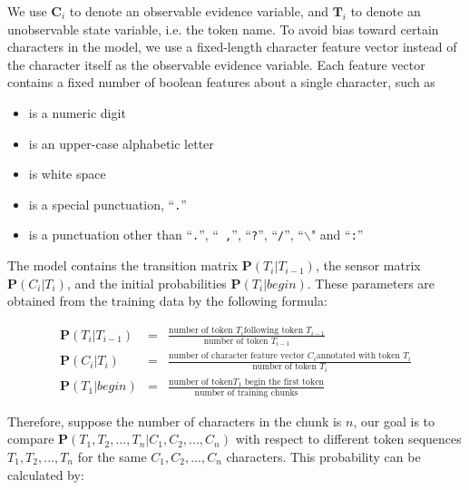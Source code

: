  
We use $\mathbf{C}_i$ to denote an observable evidence variable, 
and $\mathbf{T}_i$ to denote an unobservable state variable, i.e. the
token name. 
To avoid bias toward certain characters in the model, we use
a fixed-length character feature vector instead of the character itself
as the observable evidence variable. Each feature vector contains a
fixed number of boolean features about a single character, such as
\begin{itemize}
\item is a numeric digit
\item is an upper-case alphabetic letter
\item is white space
\item is a special punctuation, ``{\tt .}''
\item is a punctuation other than ``{\tt .}'', ``{\tt
,}'', ``{\tt ?}'', ``{\tt /}'', ``{\tt $\backslash$}" and ``{\tt :}''
\end{itemize}

The model contains the transition matrix $\mathbf{P}(T_i|T_{i-1})$,
the sensor matrix $\mathbf{P}(C_i|T_i)$, and the initial
probabilities $\mathbf{P}(T_i|begin)$. These parameters are obtained
from the training data by the following formula:

\begin{eqnarray*}
\mathbf{P}(T_i|T_{i-1}) & = & \frac{\textrm{number of token }T_i\textrm{
following token }T_{i-1}}{\textrm{number of token }T_{i-1}} \label{eqn:1}\\
\mathbf{P}(C_i|T_i) & = & \frac{\textrm{number of character feature
vector }C_i\textrm{
annotated with token }T_i}{\textrm{number of token }T_i} \\
\mathbf{P}(T_1|begin) & = & \frac{\textrm{number of token
}T_1\textrm{ begin the first token}}{\textrm{number of training
chunks}} \label{eqn:2}
\end{eqnarray*}

Therefore, suppose the number of characters in the chunk is $n$, our
goal is to compare $\mathbf{P}(T_1, T_2, ..., T_n|C_1, C_2, ..., C_n)$
with respect to different token sequences $T_1, T_2, ..., T_n$ for the
same $C_1, C_2, ..., C_n$ characters. This probability can be
calculated by:

